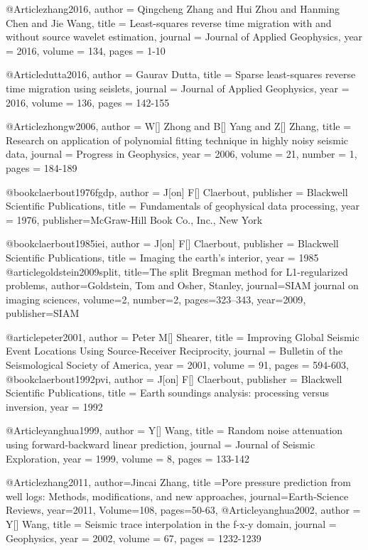@Article{zhang2016,
  author = 	 {Qingcheng Zhang and Hui Zhou and Hanming Chen and Jie Wang},
  title = 	 {Least-squares reverse time migration with and without source wavelet estimation},
  journal = 	 {Journal of Applied Geophysics},
  year = 	 2016,
  volume = 	 134,
  pages = 	 {1-10}}
  

@Article{dutta2016,
  author = 	 {Gaurav Dutta},
  title = 	 {Sparse least-squares reverse time migration using seislets},
  journal = 	 {Journal of Applied Geophysics},
  year = 	 2016,
  volume = 	 136,
  pages = 	 {142-155}}

@Article{zhongw2006,
  author = 	 {W[] Zhong and B[] Yang and Z[] Zhang},
  title = 	 {Research on application of polynomial fitting technique in highly noisy seismic data},
  journal = 	 {Progress in Geophysics},
  year = 	 2006,
  volume = 	 21,
  number = 	 1,
  pages = 	 {184-189}}

@book{claerbout1976fgdp,
   author = {J[on] F[] Claerbout},
   publisher = {Blackwell Scientific Publications},
   title = {Fundamentals of geophysical data processing},
   year = {1976},
   publisher={McGraw-Hill Book Co., Inc., New York}
}

@book{claerbout1985iei,
   author = {J[on] F[] Claerbout},
   publisher = {Blackwell Scientific Publications},
   title = {Imaging the earth's interior},
   year = {1985}
}
@article{goldstein2009split,
  title={The split Bregman method for L1-regularized problems},
  author={Goldstein, Tom and Osher, Stanley},
  journal={SIAM journal on imaging sciences},
  volume={2},
  number={2},
  pages={323--343},
  year={2009},
  publisher={SIAM}
}

@article{peter2001,
  author =	 {Peter M[] Shearer},
  title =	 {Improving Global Seismic Event Locations Using Source-Receiver Reciprocity},
  journal = 	 {Bulletin of the Seismological Society of America},
  year = 	 2001,
  volume =	 91,
  pages =	 {594-603},
}
@book{claerbout1992pvi,
   author = {J[on] F[] Claerbout},
   publisher = {Blackwell Scientific Publications},
   title = {Earth soundings analysis: processing versus inversion},
   year = {1992}
}

@Article{yanghua1999,
  author = 	 {Y[] Wang},
  title = 	 {Random noise attenuation using forward-backward linear prediction},
  journal = 	 {Journal of Seismic Exploration},
  year = 	 1999,
  volume =	 8,
  pages =	 {133-142}
}

@Article{zhang2011,
  author={Jincai Zhang},
  title ={Pore pressure prediction from well logs: Methods, modifications, and new approaches},
  journal={Earth-Science Reviews},
  year=2011,
  Volume=108,
  pages={50-63},
}
@Article{yanghua2002,
  author = 	 {Y[] Wang},
  title = 	 {Seismic trace interpolation in the f-x-y domain},
  journal = 	 {Geophysics},
  year = 	 2002,
  volume =	 67,
  pages =	 {1232-1239}
}

